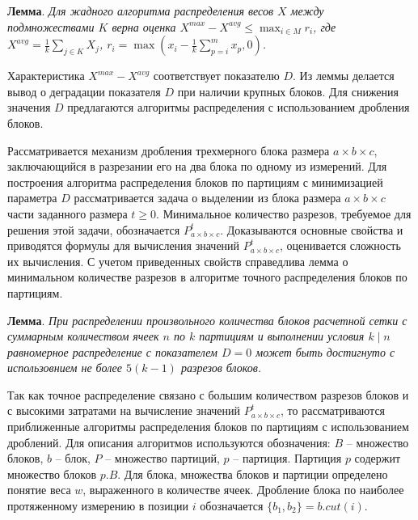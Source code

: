 \documentclass[a4paper,14pt]{extarticle}                     %
\theoremstyle{plain}                                         %
\begin{document}
\textbf{Лемма}. \textit{Для жадного алгоритма распределения весов $X$ между подмножествами $K$ верна оценка $X^{max} - X^{avg} \le \max_{i \in M}{r_i}$, где $X^{avg} = \frac{1}{k}\sum_{j \in K}{X_j}$, $r_i = \max{( x_i - \frac{1}{k} \sum_{p = i}^{m}{x_p}, 0)}$.}

Характеристика $X^{max} - X^{avg}$ соответствует показателю $D$.
Из леммы делается вывод о деградации показателя $D$ при наличии крупных блоков.
Для снижения значения $D$ предлагаются алгоритмы распределения с использованием дробления блоков.

Рассматривается механизм дробления трехмерного блока размера $a \times b \times c$, заключающийся в разрезании его на два блока по одному из измерений.
Для построения алгоритма распределения блоков по партициям с минимизацией параметра $D$ рассматривается задача о выделении из блока размера $a \times b \times c$ части заданного размера $t \ge 0$.
Минимальное количество разрезов, требуемое для решения этой задачи, обозначается $P_{a \times b \times c}^t$.
Доказываются основные свойства и приводятся формулы для вычисления значений $P_{a \times b \times c}^t$, оценивается сложность их вычисления.
С учетом приведенных свойств справедлива лемма о минимальном количестве разрезов в алгоритме точного распределения блоков по партициям.

\textbf{Лемма}. \textit{При распределении произвольного количества блоков расчетной сетки с суммарным количеством ячеек $n$ по $k$ партициям и выполнении условия $k \mid n$ равномерное распределение с показателем $D = 0$ может быть достигнуто с использовнием не более $5(k - 1)$ разрезов блоков.}

Так как точное распределение связано с большим количеством разрезов блоков и с высокими затратами на вычисление значений $P_{a \times b \times c}^t$, то рассматриваются приближенные алгоритмы распределения блоков по партициям с использованием дроблений.
Для описания алгоритмов используются обозначения: $B$ -- множество блоков, $b$ -- блок, $P$ -- множество партиций, $p$ -- партиция.
Партиция $p$ содержит множество блоков $p.B$.
Для блока, множества блоков и партиции определено понятие веса $w$, выраженного в количестве ячеек.
Дробление блока по наиболее протяженному измерению в позиции $i$ обозначается $\{b_1, b_2\} = b.cut(i)$.
\end{document}
